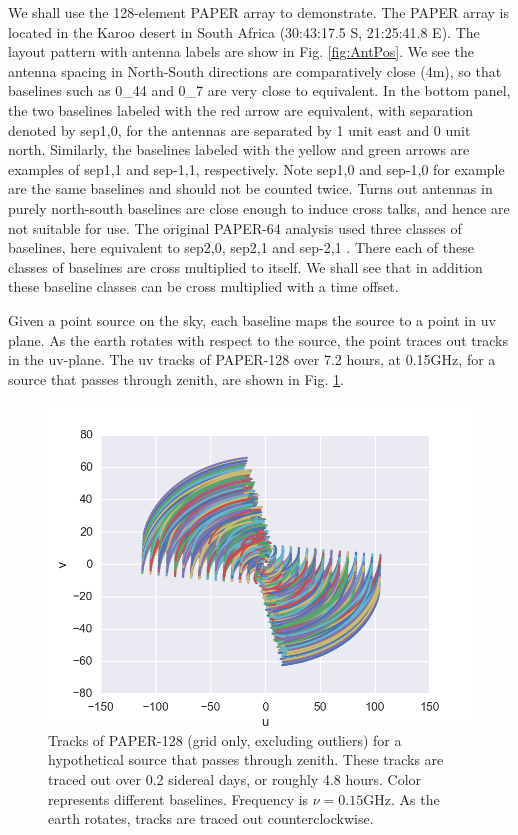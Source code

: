 \documentclass[preprint2,numberedappendix,tighten,twocolappendix]{aastex6}  %
\renewcommand\[{\begin{equation}}
\renewcommand\]{\end{equation}}
\begin{document}
We shall use the 128-element PAPER array to demonstrate. 
The PAPER array is located in the Karoo desert in South Africa (30:43:17.5
S, 21:25:41.8 E). The layout pattern with antenna labels are show
in Fig. \ref{fig:AntPos}. We see the antenna spacing in North-South
directions are comparatively close (4m), so that baselines such as
0\_44 and 0\_7 are very close to equivalent. In the bottom panel,
the two baselines labeled with the red arrow are equivalent, with
separation denoted by sep1,0, for the antennas are separated by 1
unit east and 0 unit north. Similarly, the baselines labeled with
the yellow and green arrows are examples of sep1,1 and sep-1,1, respectively.
Note sep1,0 and sep-1,0 for example are the same baselines and should
not be counted twice. Turns out antennas in purely north-south baselines
are close enough to induce cross talks, and hence are not suitable
for use. The original PAPER-64 analysis used three classes of baselines, here
equivalent to 
sep2,0, sep2,1 and sep-2,1 \cite{Ali2015}. There each of these classes
of baselines are cross multiplied to itself. We shall see that in addition these
baseline classes can be cross multiplied with a time offset.


Given a point source on the sky, each baseline maps the
source to a point in uv plane. As the earth rotates with respect to
the source, the point traces out tracks in the uv-plane. 
The uv tracks of PAPER-128 over 7.2 hours, at 0.15GHz, for a source that passes through zenith, are shown in Fig. \ref{fig:Tracks}. 


\begin{figure}[H]
\includegraphics[width=\linewidth]{tracks128}
\caption{Tracks of PAPER-128 (grid only, excluding outliers) for a hypothetical source that passes through zenith.
These tracks are traced out over 0.2 sidereal days, or roughly 4.8
hours. Color represents different baselines. Frequency is $\nu=0.15\text{GHz}$.
As the earth rotates, tracks are traced out counterclockwise. \label{fig:Tracks}}
\end{figure}
\end{document}
